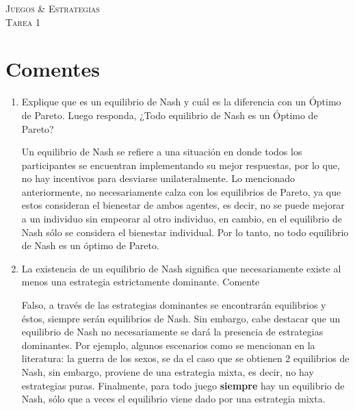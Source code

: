 \documentclass{exam}
\begin{document}
\begin{center}
\LARGE{{\textsc{Juegos \& Estrategias}}}\\
\Large{{\textsc{Tarea 1}}}
\end{center}

\hline{}{}
 \begin{flushleft}

\end{flushleft}
\hline{}{}


\section{Comentes}
\begin{enumerate}[label=(\alph*)]
    \item Explique que es un equilibrio de Nash y cuál es la diferencia con un Óptimo de Pareto. Luego responda, ¿Todo equilibrio de Nash es un Óptimo de Pareto?
    \begin{solution}
    Un equilibrio de Nash se refiere a una situación en donde todos los participantes se encuentran implementando su mejor respuestas, por lo que, no hay incentivos para desviarse unilateralmente. Lo mencionado anteriormente, no necesariamente calza con los equilibrios de Pareto, ya que estos consideran el bienestar de ambos agentes, es decir, no se puede mejorar a un individuo sin empeorar al otro individuo, en cambio, en el equilibrio de Nash sólo se considera el bienestar individual. Por lo tanto, no todo equilibrio de Nash es un óptimo de Pareto. 
     \end{solution}
    
    \item La existencia de un equilibrio de Nash significa que necesariamente existe al menos una estrategia estrictamente dominante. Comente
    \begin{solution}
    Falso, a través de las estrategias dominantes se encontrarán equilibrios y éstos, siempre serán equilibrios de Nash. Sin embargo, cabe destacar que un equilibrio de Nash no necesariamente se dará la presencia de estrategias dominantes. Por ejemplo, algunos escenarios como se mencionan en la literatura: la guerra de los sexos, se da el caso que se obtienen 2 equilibrios de Nash, sin embargo, proviene de una estrategia mixta, es decir, no hay estrategias puras. Finalmente, para todo juego \textbf{siempre} hay un equilibrio de Nash, sólo que a veces el equilibrio viene dado por una estrategia mixta. 
    \end{solution}
    

\end{enumerate}
\end{document}
